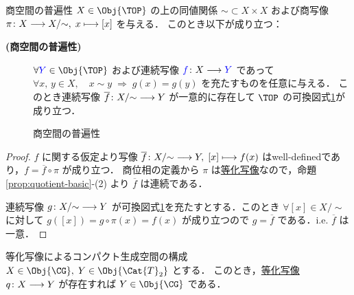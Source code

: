 \documentclass[algtopo_main]{subfiles}
\begin{document}
\begin{mycol}[label=col:univ-quotient]{商空間の普遍性}
    $X \in \Obj{\TOP}$ の上の同値関係 ${\sim}\subset X \times X$ および商写像 $\pi \colon X \longrightarrow X/{\sim},\; x \longmapsto [x]$ を与える．
    このとき以下が成り立つ：
    \begin{description}
        \item[\textbf{(商空間の普遍性)}] 
        $\forall\textcolor{blue}{Y} \in \Obj{\TOP}$ および連続写像 $\textcolor{blue}{f} \colon X \longrightarrow \textcolor{blue}{Y}$ であって $\forall x,\, y \in X,\quad x \sim y\; \Longrightarrow\; g(x) = g(y)$ を充たすものを任意に与える．
        このとき連続写像 $\overline{f} \colon X/{\sim} \longrightarrow Y$ が一意的に存在して
        $\TOP$ の可換図式\ref{cmtd:univ-quotientSp}が成り立つ．
    \end{description}
\end{mycol}

\begin{figure}[H]
    \centering
    \caption{商空間の普遍性}
    \label{cmtd:univ-quotientSp}
\end{figure}%

\begin{proof}
    $f$ に関する仮定より写像 $\overline{f} \colon X/{\sim} \longrightarrow Y,\; [x] \longmapsto f(x)$ はwell-definedであり，$f = \overline{f} \circ \pi$ が成り立つ．
    商位相の定義から $\pi$ は\hyperref[def:quotient-map]{等化写像}なので，命題\ref{prop:quotient-basic}-(2) より $\overline{f}$ は連続である．

    連続写像 $g \colon X/{\sim} \longrightarrow Y$ が可換図式\ref{cmtd:univ-quotientSp}を充たすとする．このとき $\forall [x] \in X/{\sim}$ に対して $g([x]) = g \circ \pi(x) = f(x)$ が成り立つので $g = \overline{f}$ である．i.e. $\overline{f}$ は一意．
\end{proof}



\begin{myprop}[label=prop:CG-quotient]{等化写像によるコンパクト生成空間の構成}
    $X \in \Obj{\CG},\; Y \in \Obj{\Cat{T}_2}$ とする．
    このとき，\hyperref[def:quotient-map]{等化写像} $q \colon X \longrightarrow Y$ が存在すれば $Y \in \Obj{\CG}$ である．
\end{myprop}
\end{document}
